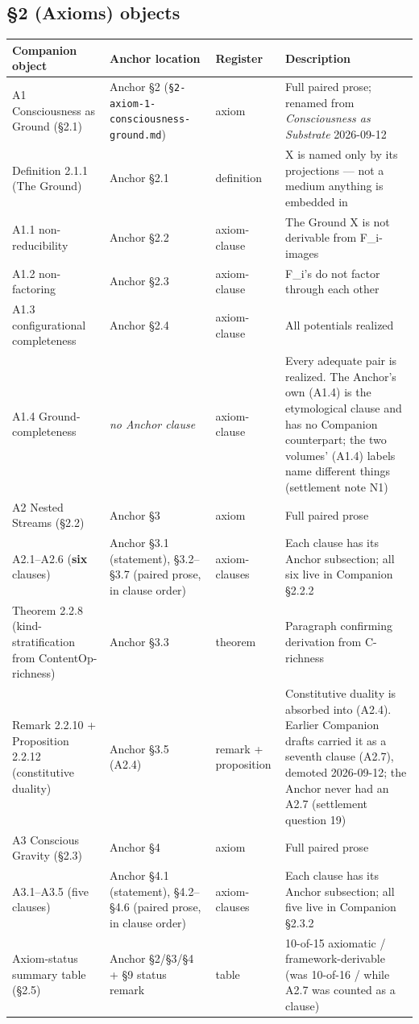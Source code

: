 \documentclass[11pt, openany]{book}
\begin{document}
\subsection{§2 (Axioms) objects}

\begingroup\setlength{\tabcolsep}{3pt}\renewcommand{\arraystretch}{1.15}\footnotesize
\begin{longtable}{p{0.69in} p{0.78in} p{0.56in} p{2.25in}}
\toprule
Companion object & Anchor location & Register & Description \\
\midrule
\endhead
\bottomrule
\endfoot
A1 Consciousness as Ground (§2.1) & Anchor §2 (\texttt{§2-axiom-1-consciousness-ground.md}) & axiom & Full paired prose; renamed from \textit{Consciousness as Substrate} 2026-09-12 \\
\midrule
Definition 2.1.1 (The Ground) & Anchor §2.1 & definition & X is named only by its projections --- not a medium anything is embedded in \\
\midrule
A1.1 non-reducibility & Anchor §2.2 & axiom-clause & The Ground X is not derivable from F\_\allowbreak{}i-images \\
\midrule
A1.2 non-factoring & Anchor §2.3 & axiom-clause & F\_\allowbreak{}i's do not factor through each other \\
\midrule
A1.3 configurational completeness & Anchor §2.4 & axiom-clause & All potentials realized \\
\midrule
A1.4 Ground-completeness & \textit{no Anchor clause} & axiom-clause & Every adequate pair is realized. The Anchor's own (A1.4) is the etymological clause and has no Companion counterpart; the two volumes' (A1.4) labels name different things (settlement note N1) \\
\midrule
A2 Nested Streams (§2.2) & Anchor §3 & axiom & Full paired prose \\
\midrule
A2.1–A2.6 (\textbf{six} clauses) & Anchor §3.1 (statement), §3.2–§3.7 (paired prose, in clause order) & axiom-clauses & Each clause has its Anchor subsection; all six live in Companion §2.2.2 \\
\midrule
Theorem 2.2.8 (kind-stratification from ContentOp-richness) & Anchor §3.3 & theorem & Paragraph confirming derivation from C-richness \\
\midrule
Remark 2.2.10 + Proposition 2.2.12 (constitutive duality) & Anchor §3.5 (A2.4) & remark + proposition & Constitutive duality is absorbed into (A2.4). Earlier Companion drafts carried it as a seventh clause (A2.7), demoted 2026-09-12; the Anchor never had an A2.7 (settlement question 19) \\
\midrule
A3 Conscious Gravity (§2.3) & Anchor §4 & axiom & Full paired prose \\
\midrule
A3.1–A3.5 (five clauses) & Anchor §4.1 (statement), §4.2–§4.6 (paired prose, in clause order) & axiom-clauses & Each clause has its Anchor subsection; all five live in Companion §2.3.2 \\
\midrule
Axiom-status summary table (§2.5) & Anchor §2/\allowbreak §3/\allowbreak §4 + §9 status remark & table & 10-of-15 axiomatic /\allowbreak  5 framework-derivable (was 10-of-16 /\allowbreak  6 while A2.7 was counted as a clause) \\
\bottomrule
\end{longtable}
\endgroup
\end{document}
